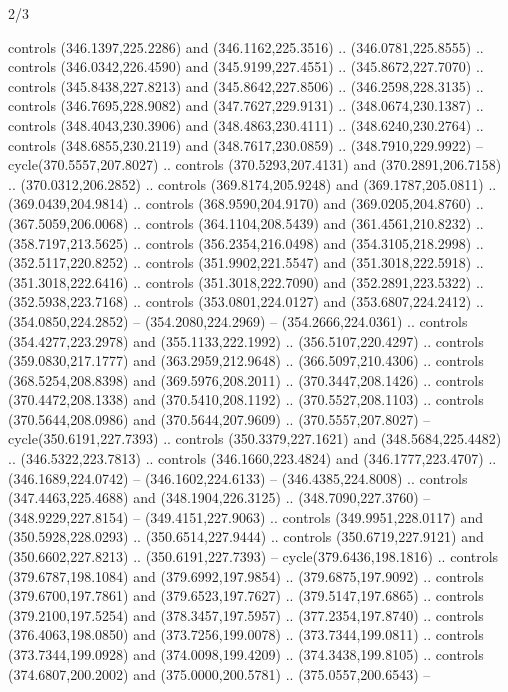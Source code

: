 \begin{flagdescription}{2/3}
\begin{scope}[xshift=0.5\flaglength,yshift=0.5\flagwidth,scale=\flagwidth/495.65]
\begin{scope}[y=0.8pt, x=0.8pt, yscale=-1,shift={(-463.76,-309.78)}]
  controls (346.1397,225.2286) and (346.1162,225.3516) .. (346.0781,225.8555) ..
  controls (346.0342,226.4590) and (345.9199,227.4551) .. (345.8672,227.7070) ..
  controls (345.8438,227.8213) and (345.8642,227.8506) .. (346.2598,228.3135) ..
  controls (346.7695,228.9082) and (347.7627,229.9131) .. (348.0674,230.1387) ..
  controls (348.4043,230.3906) and (348.4863,230.4111) .. (348.6240,230.2764) ..
  controls (348.6855,230.2119) and (348.7617,230.0859) .. (348.7910,229.9922) --
  cycle(370.5557,207.8027) .. controls (370.5293,207.4131) and
  (370.2891,206.7158) .. (370.0312,206.2852) .. controls (369.8174,205.9248) and
  (369.1787,205.0811) .. (369.0439,204.9814) .. controls (368.9590,204.9170) and
  (369.0205,204.8760) .. (367.5059,206.0068) .. controls (364.1104,208.5439) and
  (361.4561,210.8232) .. (358.7197,213.5625) .. controls (356.2354,216.0498) and
  (354.3105,218.2998) .. (352.5117,220.8252) .. controls (351.9902,221.5547) and
  (351.3018,222.5918) .. (351.3018,222.6416) .. controls (351.3018,222.7090) and
  (352.2891,223.5322) .. (352.5938,223.7168) .. controls (353.0801,224.0127) and
  (353.6807,224.2412) .. (354.0850,224.2852) -- (354.2080,224.2969) --
  (354.2666,224.0361) .. controls (354.4277,223.2978) and (355.1133,222.1992) ..
  (356.5107,220.4297) .. controls (359.0830,217.1777) and (363.2959,212.9648) ..
  (366.5097,210.4306) .. controls (368.5254,208.8398) and (369.5976,208.2011) ..
  (370.3447,208.1426) .. controls (370.4472,208.1338) and (370.5410,208.1192) ..
  (370.5527,208.1103) .. controls (370.5644,208.0986) and (370.5644,207.9609) ..
  (370.5557,207.8027) -- cycle(350.6191,227.7393) .. controls
  (350.3379,227.1621) and (348.5684,225.4482) .. (346.5322,223.7813) .. controls
  (346.1660,223.4824) and (346.1777,223.4707) .. (346.1689,224.0742) --
  (346.1602,224.6133) -- (346.4385,224.8008) .. controls (347.4463,225.4688) and
  (348.1904,226.3125) .. (348.7090,227.3760) -- (348.9229,227.8154) --
  (349.4151,227.9063) .. controls (349.9951,228.0117) and (350.5928,228.0293) ..
  (350.6514,227.9444) .. controls (350.6719,227.9121) and (350.6602,227.8213) ..
  (350.6191,227.7393) -- cycle(379.6436,198.1816) .. controls
  (379.6787,198.1084) and (379.6992,197.9854) .. (379.6875,197.9092) .. controls
  (379.6700,197.7861) and (379.6523,197.7627) .. (379.5147,197.6865) .. controls
  (379.2100,197.5254) and (378.3457,197.5957) .. (377.2354,197.8740) .. controls
  (376.4063,198.0850) and (373.7256,199.0078) .. (373.7344,199.0811) .. controls
  (373.7344,199.0928) and (374.0098,199.4209) .. (374.3438,199.8105) .. controls
  (374.6807,200.2002) and (375.0000,200.5781) .. (375.0557,200.6543) --

\end{scope}
\end{scope}
\end{flagdescription}
